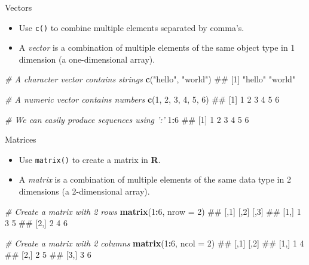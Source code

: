 \documentclass[ignorenonframetext,]{beamer}
\newenvironment{Shaded}{\begin{snugshade}}{\end{snugshade}}
\newcommand{\KeywordTok}[1]{\textcolor[rgb]{0.13,0.29,0.53}{\textbf{#1}}}
\newcommand{\DataTypeTok}[1]{\textcolor[rgb]{0.13,0.29,0.53}{#1}}
\newcommand{\DecValTok}[1]{\textcolor[rgb]{0.00,0.00,0.81}{#1}}
\newcommand{\StringTok}[1]{\textcolor[rgb]{0.31,0.60,0.02}{#1}}
\newcommand{\CommentTok}[1]{\textcolor[rgb]{0.56,0.35,0.01}{\textit{#1}}}
\newcommand{\OperatorTok}[1]{\textcolor[rgb]{0.81,0.36,0.00}{\textbf{#1}}}
\newcommand{\NormalTok}[1]{#1}
\providecommand{\tightlist}{%
  \setlength{\itemsep}{0pt}\setlength{\parskip}{0pt}}
\let\oldShaded\Shaded
\let\endoldShaded\endShaded
\renewenvironment{Shaded}{\footnotesize\oldShaded}{\endoldShaded}
\begin{document}
\begin{frame}[fragile]{Vectors}

\begin{itemize}
\tightlist
\item
  Use \texttt{c()} to combine multiple elements separated by comma's.
\item
  A \emph{vector} is a combination of multiple elements of the same
  object type in 1 dimension (a one-dimensional array).
\end{itemize}

\begin{Shaded}
\begin{Highlighting}[]
\CommentTok{# A character vector contains strings}
\KeywordTok{c}\NormalTok{(}\StringTok{"hello"}\NormalTok{, }\StringTok{"world"}\NormalTok{)}
\NormalTok{## [1] "hello" "world"}

\CommentTok{# A numeric vector contains numbers}
\KeywordTok{c}\NormalTok{(}\DecValTok{1}\NormalTok{, }\DecValTok{2}\NormalTok{, }\DecValTok{3}\NormalTok{, }\DecValTok{4}\NormalTok{, }\DecValTok{5}\NormalTok{, }\DecValTok{6}\NormalTok{)}
\NormalTok{## [1] 1 2 3 4 5 6}

\CommentTok{# We can easily produce sequences using ':'}
\DecValTok{1}\OperatorTok{:}\DecValTok{6}
\NormalTok{## [1] 1 2 3 4 5 6}
\end{Highlighting}
\end{Shaded}

\end{frame}

\begin{frame}[fragile]{Matrices}

\begin{itemize}
\tightlist
\item
  Use \texttt{matrix()} to create a matrix in \textbf{R}.
\item
  A \emph{matrix} is a combination of multiple elements of the same data
  type in 2 dimensions (a 2-dimensional array).
\end{itemize}

\begin{Shaded}
\begin{Highlighting}[]
\CommentTok{# Create a matrix with 2 rows}
\KeywordTok{matrix}\NormalTok{(}\DecValTok{1}\OperatorTok{:}\DecValTok{6}\NormalTok{, }\DataTypeTok{nrow =} \DecValTok{2}\NormalTok{)}
\NormalTok{##      [,1] [,2] [,3]}
\NormalTok{## [1,]    1    3    5}
\NormalTok{## [2,]    2    4    6}

\CommentTok{# Create a matrix with 2 columns}
\KeywordTok{matrix}\NormalTok{(}\DecValTok{1}\OperatorTok{:}\DecValTok{6}\NormalTok{, }\DataTypeTok{ncol =} \DecValTok{2}\NormalTok{)}
\NormalTok{##      [,1] [,2]}
\NormalTok{## [1,]    1    4}
\NormalTok{## [2,]    2    5}
\NormalTok{## [3,]    3    6}
\end{Highlighting}
\end{Shaded}

\end{frame}
\end{document}
